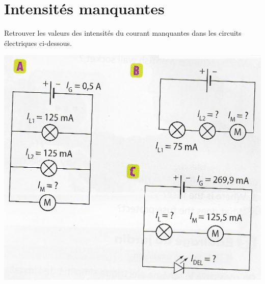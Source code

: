 \documentclass[a4paper,11pt]{exam}
\begin{document}
\section{Intensités manquantes}

Retrouver les valeurs des intensités du courant manquantes dans les circuits électriques ci-dessous. 

\begin{center}
	\includegraphics[scale=1]{img/circuits}
\end{center}


\fillwithdottedlines{5cm}




%




\ \label{LastPage}
\end{document}
